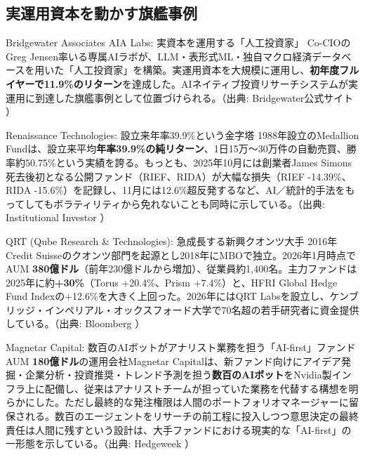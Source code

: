 \subsection{実運用資本を動かす旗艦事例}

\begin{casestudy}{Bridgewater Associates AIA Labs: 実資本を運用する「人工投資家」}
Co-CIOのGreg Jensen率いる専属AIラボが、LLM・表形式ML・独自マクロ経済データベースを用いた「人工投資家」を構築。実運用資本を大規模に運用し、\textbf{初年度フルイヤーで11.9\%のリターン}を達成した。AIネイティブ投資リサーチシステムが実運用に到達した旗艦事例として位置づけられる。（出典: Bridgewater公式サイト \cite{bridgewater_aialabs_nd}）
\end{casestudy}

\begin{casestudy}{Renaissance Technologies: 設立来年率39.9\%という金字塔}
1988年設立のMedallion Fundは、設立来平均\textbf{年率39.9\%の純リターン}、1日15万〜30万件の自動売買、勝率約50.75\%という実績を誇る。もっとも、2025年10月には創業者James Simons死去後初となる公開ファンド（RIEF、RIDA）が大幅な損失（RIEF -14.39\%、RIDA -15.6\%）を記録し、11月には12.6\%超反発するなど、AI／統計的手法をもってしてもボラティリティから免れないことも同時に示している。（出典: Institutional Investor \cite{institutionalinvestor2025renaissance}）
\end{casestudy}

\begin{casestudy}{QRT (Qube Research \& Technologies): 急成長する新興クオンツ大手}
2016年Credit Suisseのクオンツ部門を起源とし2018年にMBOで独立。2026年1月時点でAUM \textbf{380億ドル}（前年230億ドルから増加）、従業員約1,400名。主力ファンドは2025年に約\textbf{+30\%}（Torus +20.4\%、Prism +7.4\%）と、HFRI Global Hedge Fund Indexの+12.6\%を大きく上回った。2026年にはQRT Labsを設立し、ケンブリッジ・インペリアル・オックスフォード大学で70名超の若手研究者に資金提供している。（出典: Bloomberg \cite{bloomberg_qube2026}）
\end{casestudy}

\begin{casestudy}{Magnetar Capital: 数百のAIボットがアナリスト業務を担う「AI-first」ファンド}
AUM \textbf{180億ドル}の運用会社Magnetar Capitalは、新ファンド向けにアイデア発掘・企業分析・投資推奨・トレンド予測を担う\textbf{数百のAIボット}をNvidia製インフラ上に配備し、従来はアナリストチームが担っていた業務を代替する構想を明らかにした。ただし最終的な発注権限は人間のポートフォリオマネージャーに留保される。数百のエージェントをリサーチの前工程に投入しつつ意思決定の最終責任は人間に残すという設計は、大手ファンドにおける現実的な「AI-first」の一形態を示している。（出典: Hedgeweek \cite{magnetar2026}）
\end{casestudy}

